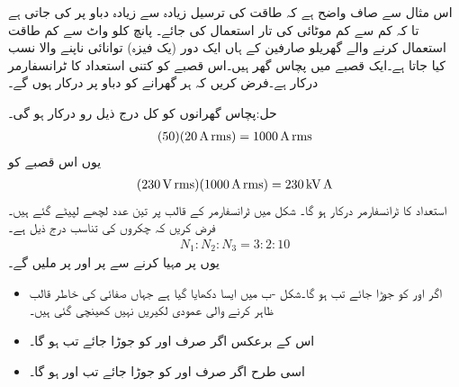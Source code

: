 اس مثال سے صاف واضح ہے کہ طاقت کی ترسیل زیادہ سے زیادہ دباو پر کی جاتی ہے تا کہ کم سے کم موٹائی کی تار استعمال کی جائے۔
پانچ کلو واٹ سے کم طاقت استعمال کرنے والے گھریلو صارفین کے ہاں ایک دور (یک فیزہ) توانائی ناپنے والا  نسب کیا جاتا ہے۔ایک قصبے میں پچاس گھر ہیں۔اس قصبے کو کتنی استعداد کا ٹرانسفارمر درکار ہے۔فرض کریں کہ ہر گھرانے کو  دباو پر  درکار ہوں گے۔

حل:پچاس گھرانوں کو کل درج ذیل رو درکار ہو گی۔
\begin{align*}
(50)(\SI{20}{\ampere}\,{\textup{rms}})=\SI{1000}{\ampere}\,{\textup{rms}}
\end{align*}
یوں اس قصبے کو
\begin{align*}
(\SI{230}{\volt}\,{\textup{rms}})(\SI{1000}{\ampere}\,{\textup{rms}})=\SI{230}{\kilo\volt\ampere}
\end{align*}
استعداد کا ٹرانسفارمر درکار ہو گا۔
شکل  میں ٹرانسفارمر کے قالب پر تین عدد لچھے لپیٹے گئے ہیں۔فرض کریں کہ چکروں کی تناسب درج ذیل ہے۔
\begin{align*}
N_1:N_2:N_3=3:2:10
\end{align*}
 یوں  پر  مہیا کرنے سے  پر  اور  پر  ملیں گے۔
\begin{itemize}
\item
اگر  اور  کو جوڑا جائے تب  ہو گا۔شکل -ب میں ایسا دکھایا گیا ہے  جہاں صفائی کی خاطر قالب ظاہر کرنے والی عمودی لکیریں نہیں کھینچی گئی ہیں۔
\item
اس کے برعکس اگر صرف  اور  کو جوڑا جائے تب  ہو گا۔
\item
اسی طرح  اگر صرف  اور  کو جوڑا جائے تب  اور  ہو گا۔
\end{itemize}

